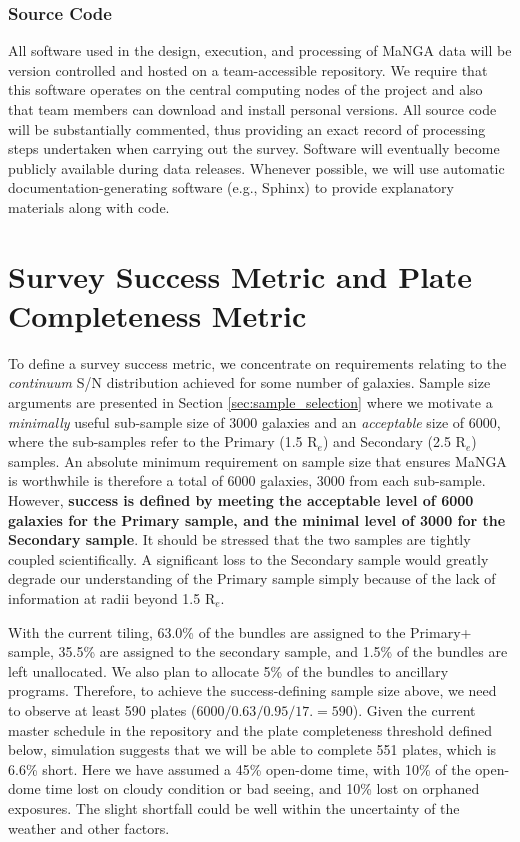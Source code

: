 \documentclass[preprint,11pt]{aastex}
\newcommand{\Reff}{{R$_{e}$}}
\begin{document}
\subsubsection{Source Code}

All software used in the design, execution, and processing of MaNGA data will be version controlled and hosted on a
team-accessible repository.  We require that this software operates on the central computing nodes of the project and also that
team members can download and install personal versions.  All source code will be substantially commented, thus providing an exact
record of processing steps undertaken when carrying out the survey.  Software will eventually become publicly available during
data releases.  Whenever possible, we will use automatic documentation-generating software (e.g., Sphinx) to provide explanatory
materials along with code.








\section{Survey Success Metric and Plate Completeness Metric}

To define a survey success metric, we concentrate on requirements relating to the {\em continuum} S/N distribution achieved for
some number of galaxies.  Sample size arguments are presented in Section \ref{sec:sample_selection} where we motivate a {\em minimally}
useful sub-sample size of 3000 galaxies and an {\em acceptable} size of 6000, where the sub-samples refer to the Primary (1.5
\Reff) and Secondary (2.5 \Reff) samples.  An absolute minimum requirement on sample size that ensures MaNGA is worthwhile is
therefore a total of 6000 galaxies, 3000 from each sub-sample.  However, {\bf success is defined by meeting the acceptable level of 6000
galaxies for the Primary sample, and the minimal level of 3000 for the Secondary sample}.  It should be stressed that the two samples are
tightly coupled scientifically.  A significant loss to the Secondary sample would greatly degrade our understanding of the Primary
sample simply because of the lack of information at radii beyond 1.5 \Reff.

With the current tiling, 63.0\% of the bundles are assigned to the Primary+ sample, 35.5\% are assigned to the secondary sample, and 1.5\% of the bundles are left unallocated. We also plan to allocate 5\% of the bundles to ancillary programs. Therefore, to achieve the success-defining sample size above, we need to observe at least 590 plates ($6000/0.63/0.95/17.= 590$). 
Given the current master schedule in the repository and the plate completeness threshold defined below, simulation suggests that we will be able to complete 551 plates, which is 6.6\% short. Here we have assumed a 45\% open-dome time, with 10\% of the open-dome time lost on cloudy condition or bad seeing, and 10\% lost on orphaned exposures. The slight shortfall could be well within the uncertainty of the weather and other factors. 
\end{document}
